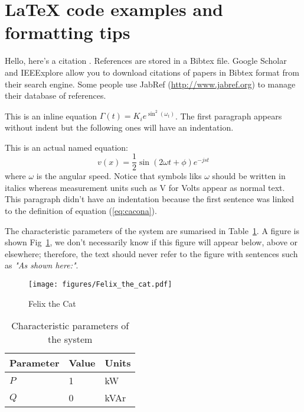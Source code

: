 \documentclass[a4paper, 10pt, conference]{ieeeconf}      %
\begin{document}



\nocite{*}







\newpage

\section{\LaTeX{} code examples and formatting tips}
Hello, here's a citation \cite{atwoodetal2015}. References are stored in a Bibtex file. Google Scholar and IEEExplore allow you to download citations of papers in Bibtex format from their search engine. Some people use JabRef (\url{http://www.jabref.org}) to manage their database of references.

This is an inline equation $\Gamma(t)=K_i e^{\sin^2(\omega_t)}$. The first paragraph appears without indent but the following ones will have an indentation.

This is an actual named equation:
\begin{equation}
v(x)=\frac{1}{2}\sin(2 \omega t + \phi) e^{-j s t}
\label{eq:cacona}
\end{equation}
\noindent where $\omega$ is the angular speed. Notice that symbols liks $\omega$ should be written in italics whereas measurement units such as V for Volts appear as normal text. This paragraph didn't have an indentation because the first sentence was linked to the definition of equation (\ref{eq:cacona}). 

The characteristic parameters of the system are sumarised in Table~\ref{tab:tab1}. A figure is shown Fig~\ref{fig:felix}, we don't necessarily know if this figure will appear below, above or elsewhere; therefore, the text should never refer to the figure with sentences such as {\it "As shown here:"}.

\begin{figure}[htbp]
\centering
\texttt{[image: figures/Felix\_the\_cat.pdf]}
\caption{Felix the Cat}
\label{fig:felix}
\end{figure}

\begin{table}[htbp]
	\centering
	\begin{tabular}{lll}
		Parameter & Value & Units\\
		\hline
		$P$ & 1 & kW \\
		$Q$ & 0 & kVAr\\
	    \hline
	\end{tabular}
	\caption{Characteristic parameters of the system}
	\label{tab:tab1}
\end{table}
\end{document}
